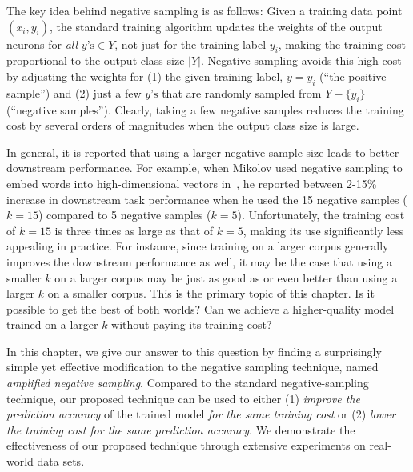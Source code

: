 The key idea behind negative sampling is as follows: Given a training data point $(x_i, y_i)$, the standard training algorithm updates the weights of the output neurons for \emph{all} $y\text{'s} \in Y$, not just for the training label $y_i$, making the training cost proportional to the output-class size $\vert Y \vert$. Negative sampling avoids this high cost by adjusting the weights for (1) the given training label, $y = y_i$ (``the positive sample'') and (2) just a few $y\text{'s}$ that are randomly sampled from $Y - \{y_i\}$ (``negative samples''). Clearly, taking a few negative samples reduces the training cost by several orders of magnitudes when the output class size is large. 

In general, it is reported that using a larger negative sample size leads to better downstream performance. For example, when Mikolov used negative sampling to embed words into high-dimensional vectors in~\citep{mikolov2013distributed}, he reported between 2-15\% increase in downstream task performance when he used the 15 negative samples ($k=15$) compared to 5 negative samples ($k=5$). Unfortunately, the training cost of $k=15$ is three times as large as that of $k=5$, making its use significantly less appealing in practice. For instance, since training on a larger corpus generally improves the downstream performance as well, it may be the case that using a smaller $k$ on a larger corpus may be just as good as or even better than using a larger $k$ on a smaller corpus. This is the primary topic of this chapter. Is it possible to get the best of both worlds? Can we achieve a higher-quality model trained on a larger $k$ without paying its training cost?


In this chapter, we give our answer to this question by finding a surprisingly simple yet effective  modification to the negative sampling technique, named \emph{amplified negative sampling}.  Compared to the standard negative-sampling technique, our proposed technique can be used to either (1) \emph{improve the prediction accuracy} of the trained model \emph{for the same training cost} or (2) \emph{lower the training cost for the same prediction accuracy}. We demonstrate the effectiveness of our proposed technique through extensive experiments on real-world data sets.

